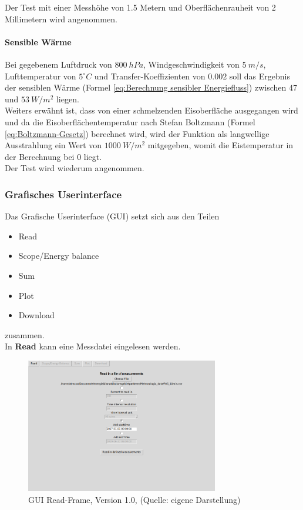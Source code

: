 \documentclass[11pt,a4paper]{article}
\newcommand{\guiplotsize}{0.75}
\newcommand{\guiversion}{1.0}
\begin{document}
Der Test mit einer Messhöhe von 1.5 Metern und Oberflächenrauheit von 2 Millimetern wird angenommen.

\paragraph{Sensible Wärme}
Bei gegebenem Luftdruck von $800~hPa$, Windgeschwindigkeit von $5~m/s$, Lufttemperatur von $5^\circ C$ und Transfer-Koeffizienten von $0.002$ soll das Ergebnis der sensiblen Wärme (Formel \ref{eq:Berechnung sensibler Energiefluss}) zwischen 47 und $53~W/m^2$ liegen. \\
Weiters erwähnt ist, dass von einer schmelzenden Eisoberfläche ausgegangen wird und da die Eisoberflächentemperatur nach Stefan Boltzmann (Formel \ref{eq:Boltzmann-Gesetz}) berechnet wird, wird der Funktion als langwellige Ausstrahlung ein Wert von $1000~W/m^2$ mitgegeben, womit die Eistemperatur in der Berechnung bei 0 liegt.\\

Der Test wird wiederum angenommen.

\subsubsection{Grafisches Userinterface}
Das Grafische Userinterface (GUI) setzt sich aus den Teilen 
\begin{itemize}
\item Read
\item Scope/Energy balance
\item Sum
\item Plot
\item Download
\end{itemize}
zusammen.\\

In \textbf{Read} kann eine Messdatei eingelesen werden. 

\begin{figure}[H]
\centering
\includegraphics[width=\guiplotsize\textwidth]{pictures/GUI/Read_Frame.png}
\caption[GUI Read-Frame, Version \guiversion]{GUI Read-Frame, Version \guiversion, (Quelle: eigene Darstellung)}
\label{fig:GUI Read-Frame}
\end{figure}
\end{document}
